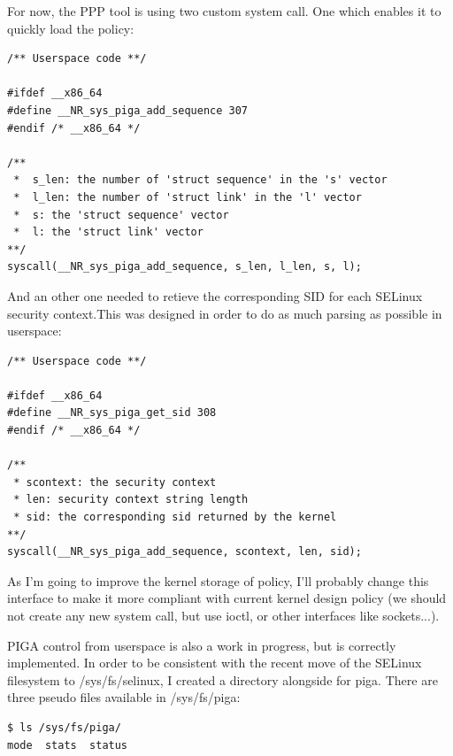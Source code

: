 \documentclass[pdftex,a4paper,titlepage,11pt]{article}
\begin{document}
For now, the PPP tool is using two custom system call. One which enables it to
quickly load the policy:

\begin{lstlisting}
/** Userspace code **/

#ifdef __x86_64
#define __NR_sys_piga_add_sequence 307
#endif /* __x86_64 */

/**
 *  s_len: the number of 'struct sequence' in the 's' vector
 *  l_len: the number of 'struct link' in the 'l' vector
 *  s: the 'struct sequence' vector
 *  l: the 'struct link' vector
**/
syscall(__NR_sys_piga_add_sequence, s_len, l_len, s, l);
\end{lstlisting}

\medskip

And an other one needed to retieve the corresponding SID for each SELinux
security context.This was designed in order to do as much parsing as possible in
userspace:

\begin{lstlisting}
/** Userspace code **/

#ifdef __x86_64
#define __NR_sys_piga_get_sid 308
#endif /* __x86_64 */

/**
 * scontext: the security context
 * len: security context string length
 * sid: the corresponding sid returned by the kernel
**/
syscall(__NR_sys_piga_add_sequence, scontext, len, sid);
\end{lstlisting}

\medskip

As I'm going to improve the kernel storage of policy, I'll probably change this
interface to make it more compliant with current kernel design policy (we should
not create any new system call, but use ioctl, or other interfaces like
sockets...).

\bigskip

PIGA control from userspace is also a work in progress, but is correctly
implemented. In order to be consistent with the recent move of the SELinux
filesystem to /sys/fs/selinux, I created a directory alongside for piga. There
are three pseudo files available in /sys/fs/piga:

\begin{lstlisting}
$ ls /sys/fs/piga/
mode  stats  status
\end{lstlisting}
\end{document}
